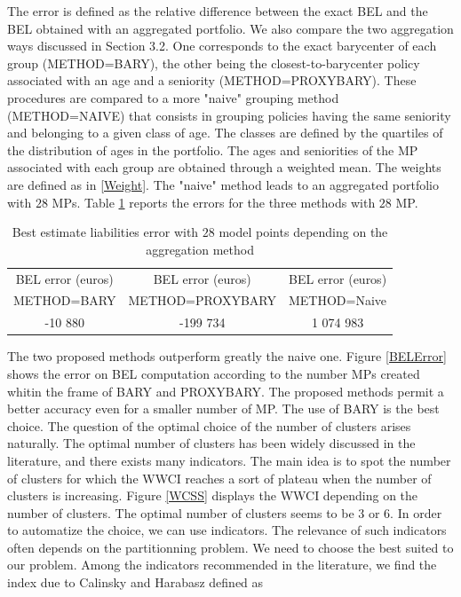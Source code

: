 The error is defined as the relative difference between the exact BEL and the BEL obtained with an aggregated portfolio. We also compare the two aggregation ways discussed in Section 3.2. One corresponds to the exact barycenter of each group (METHOD=BARY), the other being the closest-to-barycenter policy associated with an age and a seniority (METHOD=PROXYBARY). These procedures are compared to a more "naive" grouping method (METHOD=NAIVE) that consists in grouping policies having the same seniority and belonging to a given class of age. The classes are defined by the quartiles of the distribution of ages in the portfolio. The ages and seniorities of the MP associated with each group are obtained through a weighted mean. The weights are defined as in \eqref{Weight}.  The "naive" method leads to an aggregated portfolio with $28$ MPs. Table \ref{28GroupsBELError} reports the errors for the three methods with $28$ MP. 
\begin{table}[ht!]
\centering
\begin{tabular}{|c|c|c|}
\hline
BEL error (euros) &BEL error (euros)&BEL error (euros) \\
 METHOD=BARY& METHOD=PROXYBARY& METHOD=Naive\\
\hline\hline
-10 880&-199 734 &1 074 983\\
\hline
\end{tabular}
\caption{Best estimate liabilities error with $28$ model points depending on the aggregation method}
\label{28GroupsBELError}
\end{table}
The two proposed methods outperform greatly the naive one. Figure \ref{BELError} shows the error on BEL computation according to the number MPs created whitin the frame of BARY and PROXYBARY. The proposed methods permit a better accuracy even for a smaller number of MP. The use of BARY is the best choice. The question of the optimal choice of the number of clusters arises naturally. The optimal number of clusters has been widely discussed in the literature, and there exists many indicators. The main idea is to spot the number of clusters for which the WWCI reaches a sort of plateau when the number of clusters is increasing. Figure \ref{WCSS} displays the WWCI depending on the number of clusters. The optimal number of clusters seems to be $3$ or $6$. In order to automatize the choice, we can use indicators. The relevance of such indicators often depends on the partitionning problem. We need to choose the best suited to our problem. Among the indicators recommended in the literature, we find the index due to Calinsky and Harabasz \citet{CaHa74} defined as

